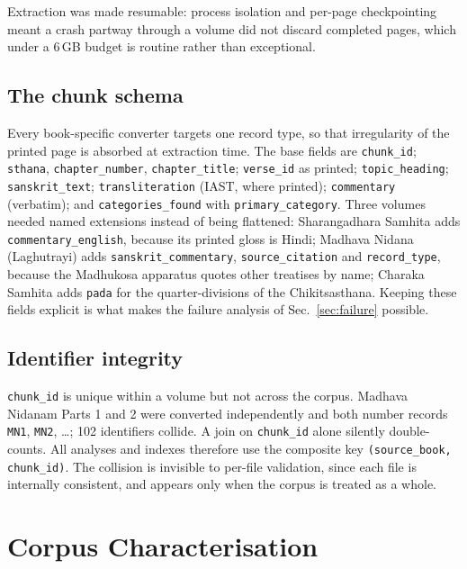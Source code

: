 \documentclass[10pt,twocolumn,letterpaper]{article}
\begin{document}
Extraction was made resumable: process isolation and per-page checkpointing meant
a crash partway through a volume did not discard completed pages, which under a
6\,GB budget is routine rather than exceptional.

\subsection{The chunk schema}

Every book-specific converter targets one record type, so that irregularity of
the printed page is absorbed at extraction time. The base fields are
\texttt{chunk\_id}; \texttt{sthana}, \texttt{chapter\_number},
\texttt{chapter\_title}; \texttt{verse\_id} as printed; \texttt{topic\_heading};
\texttt{sanskrit\_text}; \texttt{transliteration} (IAST, where printed);
\texttt{commentary} (verbatim); and \texttt{categories\_found} with
\texttt{primary\_category}. Three volumes needed named extensions instead of being
flattened: Sharangadhara Samhita adds \texttt{commentary\_english}, because its
printed gloss is Hindi; Madhava Nidana (Laghutrayi) adds
\texttt{sanskrit\_commentary}, \texttt{source\_citation} and \texttt{record\_type},
because the Madhukosa apparatus quotes other treatises by name; Charaka Samhita adds
\texttt{pada} for the quarter-divisions of the Chikitsasthana. Keeping these fields
explicit is what makes the failure analysis of Sec.~\ref{sec:failure} possible.

\subsection{Identifier integrity}

\texttt{chunk\_id} is unique within a volume but not across the corpus. Madhava
Nidanam Parts 1 and 2 were converted independently and both number records
\texttt{MN1}, \texttt{MN2}, \dots; 102 identifiers collide. A join on
\texttt{chunk\_id} alone silently double-counts. All analyses and indexes therefore
use the composite key \texttt{(source\_book, chunk\_id)}. The collision is
invisible to per-file validation, since each file is internally consistent, and
appears only when the corpus is treated as a whole.

\section{Corpus Characterisation}
\label{sec:char}
\end{document}
